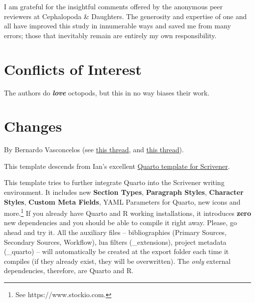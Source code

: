 \documentclass[
  12pt,
  a4paper,
  oneside,
  titlepage,
  toclink=all,
  toc=bibliography]{scrbook}
\theoremstyle{plain}
\theoremstyle{plain}
\theoremstyle{definition}
\theoremstyle{definition}
\theoremstyle{plain}
\theoremstyle{plain}
\theoremstyle{plain}
\theoremstyle{definition}
\theoremstyle{remark}
\begin{document}
I am grateful for the insightful comments offered by the anonymous peer
reviewers at Cephalopoda \& Daughters. The generosity and expertise of
one and all have improved this study in innumerable ways and saved me
from many errors; those that inevitably remain are entirely my own
responsibility.

\hypertarget{sec-scriv177}{%
\chapter{Conflicts of Interest}\label{sec-scriv177}}

The authors do \textbf{\emph{love}} octopods, but this in no way biases
their work.

\hypertarget{sec-scriv178}{%
\chapter{Changes}\label{sec-scriv178}}

\protect\hypertarget{scriv178}{}{}

By Bernardo Vasconcelos (see
\href{forum.literatureandlatte.com/t/scrivener-quarto-cite-tools-advanced-bibliography-for-a-technical-academic-publishing-workflow/133803}{this
thread}, and \href{forum.literatureandlatte.com/t/134755}{this thread}).

This template descends from Ian's excellent
\href{forum.literatureandlatte.com/t/scrivener-quarto-a-technical-academic-publishing-workflow/129769}{Quarto
template for Scrivener}.

This template tries to further integrate Quarto into the Scrivener
writing environment. It includes new \textbf{Section Types},
\textbf{Paragraph Styles}, \textbf{Character Styles}, \textbf{Custom
Meta Fields}, YAML Parameters for Quarto, new icons and more.\footnote{See
  https://www.stockio.com.} If you already have Quarto and R working
installations, it introduces \textbf{zero} new dependencies and you
should be able to compile it right away. Please, go ahead and try it.
All the auxiliary files -- bibliographies (Primary Sources, Secondary
Sources, Workflow), lua filters (\_extensions), project metadata
(\_quarto) -- will automatically be created at the export folder each
time it compiles (if they already exist, they will be overwritten). The
\emph{only} external dependencies, therefore, are Quarto and R.
\end{document}

